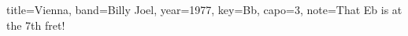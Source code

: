 \documentclass{skrul-leadsheet}
\begin{document}
\begin{song}[transpose-capo=true]{title={Vienna}, band={Billy Joel}, year={1977}, key={Bb}, capo={3}, note={That Eb is at the 7th fret!}}




\end{song}
\end{document}
